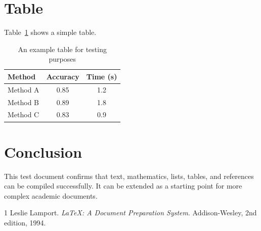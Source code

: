 \documentclass[12pt,a4paper]{article}
\begin{document}
\section{Table}

Table~\ref{tab:example} shows a simple table.

\begin{table}[h]
\centering
\begin{tabular}{lcc}
\toprule
Method & Accuracy & Time (s) \\
\midrule
Method A & 0.85 & 1.2 \\
Method B & 0.89 & 1.8 \\
Method C & 0.83 & 0.9 \\
\bottomrule
\end{tabular}
\caption{An example table for testing purposes}
\label{tab:example}
\end{table}

\section{Conclusion}

This test document confirms that text, mathematics, lists, tables,
and references can be compiled successfully. It can be extended
as a starting point for more complex academic documents.


\begin{thebibliography}{1}
Leslie Lamport.
\textit{\LaTeX: A Document Preparation System}.
Addison-Wesley, 2nd edition, 1994.
\end{thebibliography}
\end{document}
